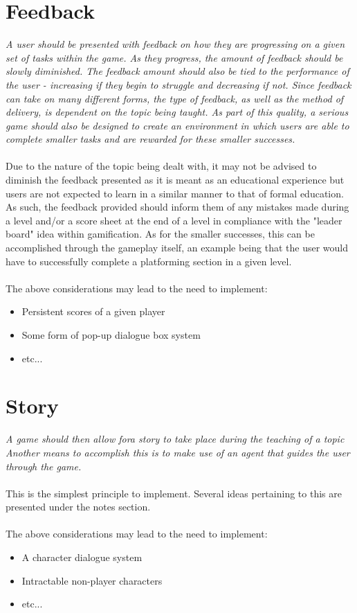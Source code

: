 \documentclass[a4paper]{scrreprt}
\begin{document}
\section{Feedback}
\textit{A user should be presented with feedback on how they are progressing on a given set of tasks within the game. As they progress, the amount of feedback should be slowly diminished. The feedback amount should also be tied to the performance of the user - increasing if they begin to struggle and decreasing if not. Since feedback can take on many different forms, the type of feedback, as well as the method of delivery, is dependent on the topic being taught. As part of this quality, a serious game should also be designed to create an environment in which users are able to complete smaller tasks and are rewarded for these smaller successes.}
\\\\
Due to the nature of the topic being dealt with, it may not be advised to diminish the feedback presented as it is meant as an educational experience but users are not expected to learn in a similar manner to that of formal education. As such, the feedback provided should inform them of any mistakes made during a level and/or a score sheet at the end of a level in compliance with the "leader board" idea within gamification. As for the smaller successes, this can be accomplished through the gameplay itself, an example being that the user would have to successfully complete a platforming section in a given level.
\\\\
The above considerations may lead to the need to implement:
\begin{itemize}
\item Persistent scores of a given player
\item Some form of pop-up dialogue box system
\item etc...
\end{itemize}


\section{Story}
\textit{A game should then allow fora story to take place during the teaching of a topic Another means to accomplish this is to make use of an agent that guides the user through the game.}
\\\\
This is the simplest principle to implement. Several ideas pertaining to this are presented under the notes section.
\\\\
The above considerations may lead to the need to implement:
\begin{itemize}
\item A character dialogue system
\item Intractable non-player characters
\item etc...
\end{itemize}
\end{document}
